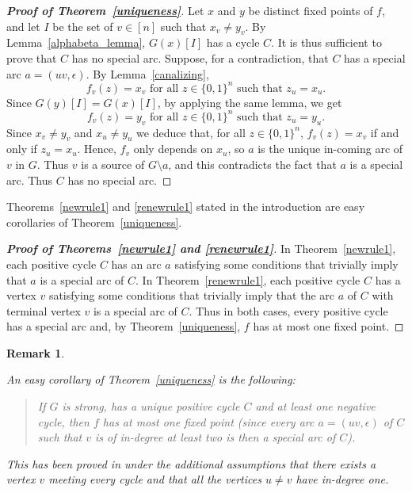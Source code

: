 \documentclass[11pt,a4paper]{article}
\newtheorem{remark}{Remark}
\def\B{\{0,1\}}
\def\e{\epsilon}
\begin{document}
\begin{proof}[{\bf Proof of Theorem~\ref{uniqueness}}]
Let $x$ and $y$ be distinct fixed points of $f$, and let $I$ be the set of $v\in [n]$ such that $x_v\neq y_v$. By Lemma~\ref{alphabeta_lemma}, $G(x)[I]$ has a cycle $C$. It is thus sufficient to prove that $C$ has no special arc. Suppose, for a contradiction, that $C$ has a special arc $a=(uv,\e)$. By Lemma~\ref{canalizing}, 
\[
f_v(z)=x_v\text{ for all $z\in\B^n$ such that $z_u=x_u$}.
\]
Since $G(y)[I]=G(x)[I]$, by applying the same lemma, we get 
\[
f_v(z)=y_v\text{ for all $z\in\B^n$ such that $z_u=y_u$}.
\]
Since $x_v\neq y_v$ and $x_u\neq y_u$ we deduce that, for all $z\in\B^n$, $f_v(z)=x_v$ if and only if $z_u=x_u$. Hence, $f_v$ only depends on $x_u$, so $a$ is the unique in-coming arc of $v$ in $G$. Thus $v$ is a source of $G\setminus a$, and this contradicts the fact that $a$ is a special arc. Thus $C$ has no special arc. 
\end{proof}

Theorems~\ref{newrule1} and \ref{renewrule1} stated in the introduction are easy corollaries of Theorem~\ref{uniqueness}.

\begin{proof}[{\bf Proof of Theorems~\ref{newrule1} and  \ref{renewrule1}}] 
In Theorem~\ref{newrule1}, each positive cycle $C$ has an arc $a$ satisfying some conditions that trivially imply that $a$ is a special arc of $C$. In Theorem~\ref{renewrule1}, each positive cycle $C$ has a vertex $v$ satisfying some conditions that trivially imply that the arc $a$ of $C$ with terminal vertex $v$ is a special arc of $C$. Thus in both cases, every positive cycle has a special arc and, by Theorem~\ref{uniqueness}, $f$ has at most one fixed point. 
\end{proof}

\begin{remark}\label{rem:DR1}
{\em An easy corollary of Theorem~\ref{uniqueness} is the following: 
\begin{quote}
{\em If $G$ is strong, has a unique positive cycle $C$ and at least one negative cycle, then $f$ has at most one fixed point} (since every arc $a=(uv,\e)$ of $C$ such that $v$ is of in-degree at least two is then a special arc of $C$).
\end{quote}
This has been proved in \cite{DR12} under the additional assumptions that there exists a vertex $v$ meeting every cycle and that all the vertices $u\neq v$ have in-degree one.}
\end{remark}
\end{document}
